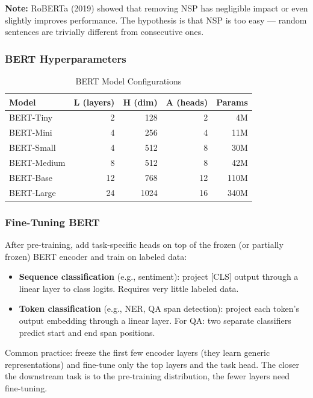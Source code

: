\documentclass[11pt, a4paper]{article}
\begin{document}
\textbf{Note:} RoBERTa (2019) showed that removing NSP has negligible impact or even slightly improves performance. The hypothesis is that NSP is too easy --- random sentences are trivially different from consecutive ones.

\subsubsection{BERT Hyperparameters}

\begin{table}[h]
\centering
\caption{BERT Model Configurations}
\begin{tabular}{@{}lrrrr@{}}
\toprule
\textbf{Model} & \textbf{L (layers)} & \textbf{H (dim)} & \textbf{A (heads)} & \textbf{Params} \\
\midrule
BERT-Tiny   & 2  & 128  & 2  & 4M   \\
BERT-Mini   & 4  & 256  & 4  & 11M  \\
BERT-Small  & 4  & 512  & 8  & 30M  \\
BERT-Medium & 8  & 512  & 8  & 42M  \\
BERT-Base   & 12 & 768  & 12 & 110M \\
BERT-Large  & 24 & 1024 & 16 & 340M \\
\bottomrule
\end{tabular}
\end{table}

\subsubsection{Fine-Tuning BERT}

\begin{defbox}
After pre-training, add task-specific heads on top of the frozen (or partially frozen) BERT encoder and train on labeled data:
\begin{itemize}[leftmargin=1.5em]
  \item \textbf{Sequence classification} (e.g., sentiment): project [CLS] output through a linear layer to class logits. Requires very little labeled data.
  \item \textbf{Token classification} (e.g., NER, QA span detection): project each token's output embedding through a linear layer. For QA: two separate classifiers predict start and end span positions.
\end{itemize}
\end{defbox}

\begin{notebox}
Common practice: freeze the first few encoder layers (they learn generic representations) and fine-tune only the top layers and the task head. The closer the downstream task is to the pre-training distribution, the fewer layers need fine-tuning.
\end{notebox}
\end{document}
